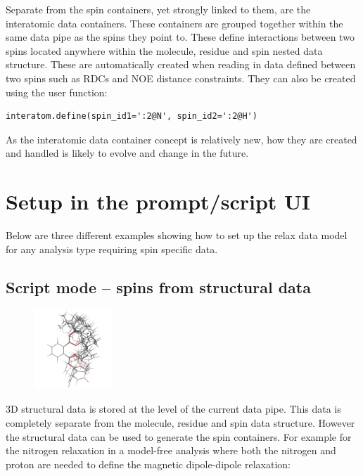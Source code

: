 Separate from the spin containers, yet strongly linked to them, are the interatomic data containers.
These containers are grouped together within the same data pipe as the spins they point to.
These define interactions between two spins located anywhere within the molecule, residue and spin nested data structure.
These are automatically created when reading in data defined between two spins such as RDCs and NOE distance constraints.
They can also be created using the  user function:

\begin{lstlisting}
interatom.define(spin_id1=':2@N', spin_id2=':2@H')
\end{lstlisting}

As the interatomic data container concept is relatively new, how they are created and handled is likely to evolve and change in the future.




\section{Setup in the prompt/script UI}

Below are three different examples showing how to set up the relax data model for any analysis type requiring spin specific data.



\subsection{Script mode -- spins from structural data} \label{sect: script - structural data}

\begin{figure}[h]
  \includegraphics[width=3cm, bb=0 0 1701 1701]{graphics/misc/n_state_model/phthalic_acid_ens_600x600}
\end{figure}

3D structural data is stored at the level of the current data pipe.
This data is completely separate from the molecule, residue and spin data structure.
However the structural data can be used to generate the spin containers.
For example for the nitrogen relaxation in a model-free analysis where both the nitrogen and proton are needed to define the magnetic dipole-dipole relaxation:

